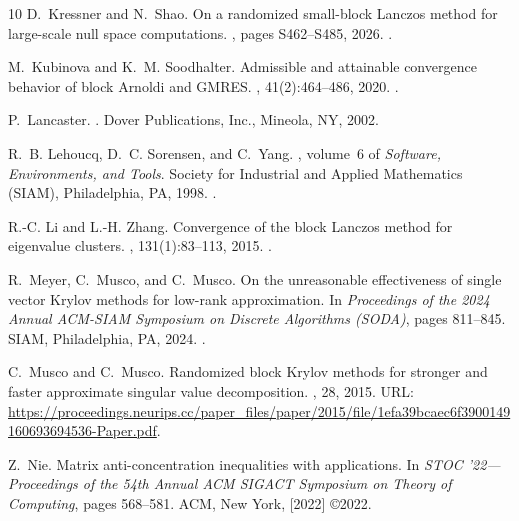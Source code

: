 \documentclass{article}
\begin{document}
\begin{thebibliography}{10}
D.~Kressner and N.~Shao.
\newblock On a randomized small-block {Lanczos} method for large-scale null
  space computations.
, pages S462--S485, 2026.
\newblock \href {https://doi.org/10.1137/24M1674881}
  {}.

M.~Kubinova and K.~M. Soodhalter.
\newblock Admissible and attainable convergence behavior of block {A}rnoldi and
  {GMRES}.
, 41(2):464--486, 2020.
\newblock \href {https://doi.org/10.1137/19M1272469}
  {}.

P.~Lancaster.
.
\newblock Dover Publications, Inc., Mineola, NY, 2002.

R.~B. Lehoucq, D.~C. Sorensen, and C.~Yang.
, volume~6 of {\em Software, Environments,
  and Tools}.
\newblock Society for Industrial and Applied Mathematics (SIAM), Philadelphia,
  PA, 1998.
\newblock \href {https://doi.org/10.1137/1.9780898719628}
  {}.

R.-C. Li and L.-H. Zhang.
\newblock Convergence of the block {L}anczos method for eigenvalue clusters.
, 131(1):83--113, 2015.
\newblock \href {https://doi.org/10.1007/s00211-014-0681-6}
  {}.

R.~Meyer, C.~Musco, and C.~Musco.
\newblock On the unreasonable effectiveness of single vector {K}rylov methods
  for low-rank approximation.
\newblock In {\em Proceedings of the 2024 {A}nnual {ACM}-{SIAM} {S}ymposium on
  {D}iscrete {A}lgorithms ({SODA})}, pages 811--845. SIAM, Philadelphia, PA,
  2024.
\newblock \href {https://doi.org/10.1137/1.9781611977912.32}
  {}.

C.~Musco and C.~Musco.
\newblock Randomized block {Krylov} methods for stronger and faster approximate
  singular value decomposition.
, 28, 2015.
\newblock URL:
  \url{https://proceedings.neurips.cc/paper_files/paper/2015/file/1efa39bcaec6f3900149160693694536-Paper.pdf}.

Z.~Nie.
\newblock Matrix anti-concentration inequalities with applications.
\newblock In {\em S{TOC} '22---{P}roceedings of the 54th {A}nnual {ACM}
  {SIGACT} {S}ymposium on {T}heory of {C}omputing}, pages 568--581. ACM, New
  York, [2022] \copyright 2022.


\end{thebibliography}
\end{document}
